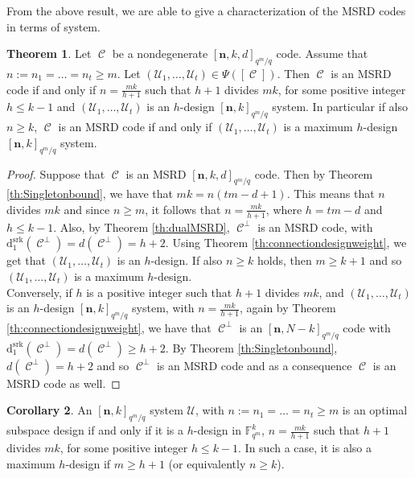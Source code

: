 \documentclass[11pt]{amsart}
\DeclareMathOperator{\C}{\mathcal{C}}
\theoremstyle{definition}
\newtheorem{theorem}{Theorem}[section]
\newtheorem{corollary}[theorem]{Corollary}
\newcommand{\F}{{\mathbb F}}
\newcommand{\ds}{\mathrm{d}^{\mathrm{srk}}}
\newcommand{\bfn}{\mathbf {n}}
\newcommand{\Fmnk}{[\bfn,k]_{q^m/q}}
\newcommand{\Fmnkd}{[\bfn,k,d]_{q^m/q}}
\begin{document}
From the above result, we are able to give a characterization of the MSRD codes in terms of system.


\begin{theorem} \label{Th:sdesignMSRD}
Let $\C$ be a nondegenerate $\Fmnkd$ code. Assume that $n:=n_1=\ldots=n_t \geq m$. Let $(\mathcal{U}_1,\ldots,\mathcal{U}_t) \in \Psi([\C])$. Then $\C$ is an MSRD code if and only if $n=\frac{mk}{h+1}$ such that  $h+1$ divides $mk$, for some positive integer $h \leq k-1$ and $(\mathcal{U}_1,\ldots,\mathcal{U}_t)$ is an $h$-design $[\bfn,k]_{q^m/q}$ system. In particular if also $n \geq k$,  $\C$ is an MSRD code if and only if $(\mathcal{U}_1,\ldots,\mathcal{U}_t)$ is a maximum $h$-design $[\bfn,k]_{q^m/q}$ system.
\end{theorem}

\begin{proof}
    Suppose that $\C$ is an MSRD $\Fmnkd$ code. Then by Theorem \ref{th:Singletonbound}, we have that $mk=n(tm-d+1)$. This means that $n$ divides $mk$ and since $n \geq m$, it follows that $n=\frac{mk}{h+1}$, where $h=tm-d$ and $h \leq k-1$. Also, by Theorem \ref{th:dualMSRD}, $\C^{\perp}$ is an MSRD code, with $\ds_{1}(\C^{\perp})=d(\C^{\perp})=h+2$. Using Theorem \ref{th:connectiondesignweight}, we get that $(\mathcal{U}_1,\ldots,\mathcal{U}_t)$ is an $h$-design. If also $n \geq k$ holds, then $m \geq k+1$ and so $(\mathcal{U}_1,\ldots,\mathcal{U}_t)$ is a maximum $h$-design. \\
    Conversely, if $h$ is a positive integer such that $h+1$ divides $mk$, and $(\mathcal{U}_1,\ldots,\mathcal{U}_t)$ is an $h$-design $[\bfn,k]_{q^m/q}$ system, with $n=\frac{mk}{h+1}$, again by Theorem \ref{th:connectiondesignweight}, we have that $\C^{\perp}$ is an $[\bfn,N-k]_{q^m/q}$ code with $\ds_{1}(\C^{\perp})=d(\C^{\perp})\geq h+2$. By Theorem \ref{th:Singletonbound}, $d(\C^{\perp}) = h+2$ and so $\C^{\perp}$ is an MSRD code and as a consequence $\C$ is an MSRD code as well.
\end{proof}

\begin{corollary} \label{cor:optimalk-1design}
    An $\Fmnk$ system $\mathcal{U}$, with $n:=n_1=\ldots=n_t \geq m$ is an optimal subspace design if and only if it is a $h$-design in $\F_{q^m}^k$, $n=\frac{mk}{h+1}$ such that $h+1$ divides $mk$, for some positive integer $h \leq k-1$. In such a case, it is also a maximum $h$-design if $m \geq h+1$ (or equivalently $n \geq k$).
\end{corollary}
\end{document}
